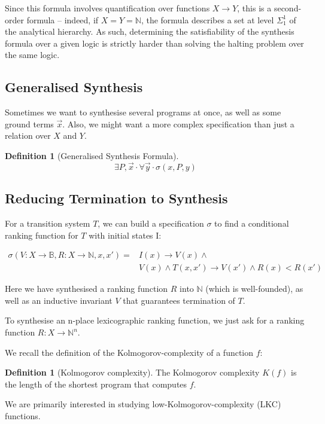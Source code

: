 \documentclass[preprint]{sigplanconf}
\theoremstyle{definition}
\newtheorem{definition}[theorem]{Definition}
\begin{document}
Since this formula involves quantification over functions $X \to Y$,
this is a second-order formula -- indeed, if $X = Y = \mathbb{N}$,
the formula describes a set at level $\Sigma_1^1$ of the analytical
hierarchy.  As such, determining the satisfiability of the synthesis
formula over a given logic is strictly harder than solving the
halting problem over the same logic.

\subsection{Generalised Synthesis}
Sometimes we want to synthesise several programs at once, as well as some
ground terms $\vec{x}$.  Also, we might want a more complex specification
than just a relation over $X$ and $Y$.

\begin{definition}[Generalised Synthesis Formula]
 $$\exists P, \vec{x} \cdotp \forall \vec{y} \cdotp \sigma(x, P, y) $$
\end{definition}

\subsection{Reducing Termination to Synthesis}
For a transition system $T$, we can build a specification $\sigma$ to find a conditional ranking function for
$T$ with initial states I:

\begin{eqnarray}
 \sigma(V: X \to \mathbb{B}, R: X \to \mathbb{N}, x, x') = & I(x) \rightarrow V(x) \wedge \\
 & V(x) \wedge T(x, x') \rightarrow V(x') \wedge R(x) < R(x') 
\end{eqnarray}

Here we have synthesised a ranking function $R$ into $\mathbb{N}$ (which is well-founded),
as well as an inductive invariant $V$ that guarantees termination of $T$.

To synthesise an n-place lexicographic ranking function, we just ask for a ranking function
$R: X \to \mathbb{N}^n$.

We recall the definition of the Kolmogorov-complexity of a function $f$:

\begin{definition}[Kolmogorov complexity]
 The Kolmogorov complexity $K(f)$ is the length of the shortest program that
 computes $f$.
\end{definition}

We are primarily interested in studying low-Kolmogorov-complexity (LKC)
functions.
\end{document}
